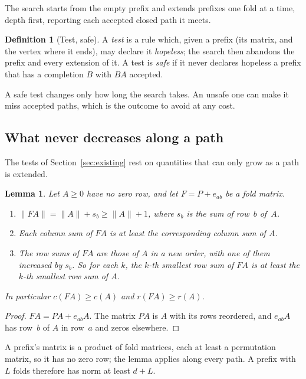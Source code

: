 \documentclass[11pt]{amsart}
\newcommand{\nrm}[1]{\lVert #1\rVert}
\theoremstyle{plain}
\newtheorem{Lemma}[Theorem]{Lemma}
\theoremstyle{definition}
\newtheorem{Definition}[Theorem]{Definition}
\begin{document}
The search starts from the empty prefix and extends prefixes one fold at a
time, depth first, reporting each accepted closed path it meets.

\begin{Definition}[Test, safe]
  \label{def:safe}
  A \emph{test} is a rule which, given a prefix (its matrix, and the vertex
  where it ends), may declare it \emph{hopeless}; the search then abandons
  the prefix and every extension of it.  A test is \emph{safe} if it never
  declares hopeless a prefix that has a completion $B$ with $BA$ accepted.
\end{Definition}

A safe test changes only how long the search takes.  An unsafe one can make
it miss accepted paths, which is the outcome to avoid at any cost.

\subsection{What never decreases along a path}

The tests of Section~\ref{sec:existing} rest on quantities that can only
grow as a path is extended.

\begin{Lemma}
  \label{lem:grow}
  Let $A\ge0$ have no zero row, and let $F=P+e_{ab}$ be a fold matrix.
  \begin{enumerate}
  \item $\nrm{FA}=\nrm{A}+s_b\ge\nrm{A}+1$, where $s_b$ is the sum of
    row~$b$ of~$A$.
  \item Each column sum of $FA$ is at least the corresponding column sum
    of $A$.
  \item The row sums of $FA$ are those of $A$ in a new order, with one of
    them increased by $s_b$.  So for each $k$, the $k$-th smallest row sum
    of $FA$ is at least the $k$-th smallest row sum of $A$.
  \end{enumerate}
  In particular $c(FA)\ge c(A)$ and $r(FA)\ge r(A)$.
\end{Lemma}

\begin{proof}
  $FA=PA+e_{ab}A$.  The matrix $PA$ is $A$ with its rows reordered, and
  $e_{ab}A$ has row~$b$ of $A$ in row~$a$ and zeros elsewhere.
\end{proof}

A prefix's matrix is a product of fold matrices, each at least a
permutation matrix, so it has no zero row; the lemma applies along every
path.  A prefix with $L$ folds therefore has norm at least $d+L$.
\end{document}
